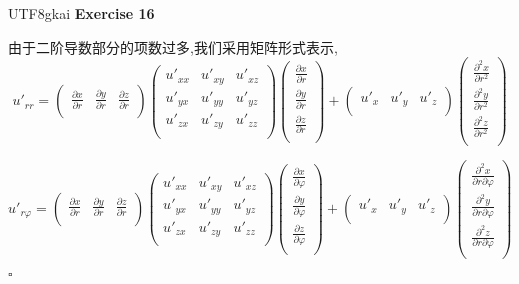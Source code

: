 \documentclass{article}
\newenvironment{exercise}[1]{%
{\textbf{Exercise #1} \\ 
    }
}{
  \hfill $\square$ 
  \par\bigskip 
}
\begin{document}
\begin{CJK}{UTF8}{gkai}
\begin{exercise}{16}
    由于二阶导数部分的项数过多,我们采用矩阵形式表示,
    \[u'_{rr} = \begin{pmatrix}
        \frac{\partial x}{\partial r}&\frac{\partial y}{\partial r}&\frac{\partial z}{\partial r}\\ 
    \end{pmatrix}
    \begin{pmatrix}
        u'_{xx}&u'_{xy}&u'_{xz}\\
        u'_{yx}&u'_{yy}&u'_{yz}\\
        u'_{zx}&u'_{zy}&u'_{zz}\\
    \end{pmatrix}
    \begin{pmatrix}
        \frac{\partial x}{\partial r}\\\frac{\partial y}{\partial r}\\\frac{\partial z}{\partial r}\\ 
    \end{pmatrix}
    +
    \begin{pmatrix}
        u'_x&u'_y&u'_z\\
    \end{pmatrix}
    \begin{pmatrix}
        \frac{\partial^2 x}{\partial r^2}\\\frac{\partial^2 y}{\partial r^2}\\\frac{\partial^2 z}{\partial r^2}\\        
    \end{pmatrix}
    \]

    \[u'_{r\varphi} = \begin{pmatrix}
        \frac{\partial x}{\partial r}&\frac{\partial y}{\partial r}&\frac{\partial z}{\partial r}\\ 
    \end{pmatrix}
    \begin{pmatrix}
        u'_{xx}&u'_{xy}&u'_{xz}\\
        u'_{yx}&u'_{yy}&u'_{yz}\\
        u'_{zx}&u'_{zy}&u'_{zz}\\
    \end{pmatrix}
    \begin{pmatrix}
        \frac{\partial x}{\partial \varphi}\\\frac{\partial y}{\partial \varphi}\\\frac{\partial z}{\partial \varphi}\\ 
    \end{pmatrix}
    +
    \begin{pmatrix}
        u'_x&u'_y&u'_z\\
    \end{pmatrix}
    \begin{pmatrix}
        \frac{\partial^2 x}{\partial r \partial \varphi}\\\frac{\partial^2 y}{\partial r \partial \varphi}\\\frac{\partial^2 z}{\partial r \partial \varphi}\\        
    \end{pmatrix}
    \]
    

\end{exercise}
\end{CJK}
\end{document}
